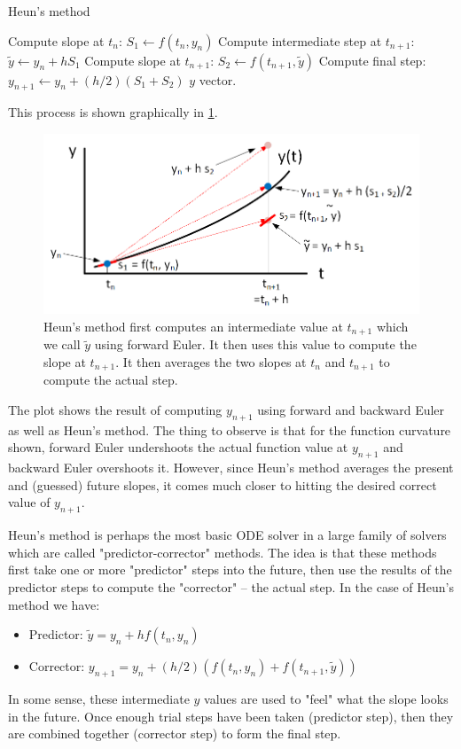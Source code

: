 \documentclass[hidelinks,notitlepage]{book}
\begin{document}
\begin{algorithm}
	\caption{Heun's method}
	\label{alg:Heun}
	\begin{algorithmic} 
		\STATE Compute slope at $t_n$: $S_1 \leftarrow f(t_n, y_n)$
		\STATE Compute intermediate step at $t_{n+1}$: $\tilde{y} \leftarrow y_n + h S_1$
		\STATE Compute slope at $t_{n+1}$: $S_2 \leftarrow f(t_{n+1}, \tilde{y})$
		\STATE Compute final step: $y_{n+1} \leftarrow y_n + (h/2)(S_1 + S_2)$
		\ENDFOR
		\RETURN $y$ vector.
	\end{algorithmic}
\end{algorithm}
This process is shown graphically in \cref{fig:HeunsMethod}.  
\begin{figure}[tbh]
	\centering
	\includegraphics[width=0.8\columnwidth]{HeunsMethod.png}
	\caption{Heun's method first computes an intermediate value at $t_{n+1}$ which we call $\tilde{y}$ using forward Euler.  It then uses this value to compute the slope at $t_{n+1}$.  It then averages the two slopes at $t_n$ and $t_{n+1}$ to compute the actual step.}
	\label{fig:HeunsMethod}
\end{figure}
The plot shows the result of computing $y_{n+1}$ using forward and backward Euler as well as Heun's method.  The thing to observe is that for the function curvature shown, forward Euler undershoots the actual function value at $y_{n+1}$ and backward Euler overshoots it.  However, since Heun's method averages the present and (guessed) future slopes, it comes much closer to hitting the desired correct value of $y_{n+1}$.

Heun's method is perhaps the most basic ODE solver in a large family of solvers which are called "predictor-corrector" methods.  The idea is that these methods first take one or more "predictor" steps into the future, then use the results of the predictor steps to compute the "corrector" -- the actual step.  In the case of Heun's method we have:
\begin{itemize}
	\item Predictor: $\tilde{y} = y_n + h f(t_n, y_n)$
	\item Corrector: $y_{n+1} = y_n + (h/2)(f(t_n, y_n) + f(t_{n+1}, \tilde{y}))$
\end{itemize}
In some sense, these intermediate $y$ values are used to "feel" what the slope looks in the future.  Once enough trial steps have been taken (predictor step), then they are combined together (corrector step) to form the final step.
\end{document}
